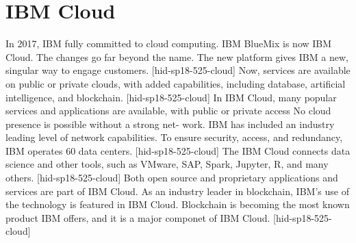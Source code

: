 \section{IBM Cloud}


In 2017, IBM fully committed to cloud computing. IBM BlueMix
is now IBM Cloud. The changes go far beyond the name. The new 
platform gives IBM a new, singular way to engage customers. 
[hid-sp18-525-cloud] Now, services are available on public or 
private clouds, with added capabilities, including database, 
artificial intelligence, and blockchain. [hid-sp18-525-cloud]
In IBM Cloud, many popular services and applications are 
available, with public or private access No cloud presence 
is possible without a strong net- work. IBM has included an 
industry leading level of network capabilities. To ensure 
security, access, and redundancy, IBM operates 60 data centers. 
[hid-sp18-525-cloud]
The IBM Cloud connects data science and other tools, such as 
VMware, SAP, Spark, Jupyter, R, and many others. 
[hid-sp18-525-cloud] Both open source and proprietary 
applications and services are part of IBM Cloud.
As an industry leader in blockchain, IBM’s use of the 
technology is featured in IBM Cloud. Blockchain is becoming 
the most known product IBM offers, and it is a major componet
of IBM Cloud. [hid-sp18-525-cloud]
